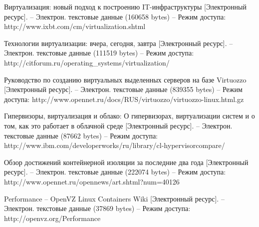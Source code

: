 \begin{thebibliography}{00}
    Виртуализация: новый подход к построению IT-инфраструктуры
    [Электронный ресурс]. --
    Электрон. текстовые данные (160658 bytes) -- 
    Режим доступа: http://www.ixbt.com/cm/virtualization.shtml

    Технологии виртуализации: вчера, сегодня, завтра
    [Электронный ресурс]. --
    Электрон. текстовые данные (111519 bytes) -- 
    Режим доступа: http://citforum.ru/operating\_systems/virtualization/

    Руководство по созданию виртуальных выделенных серверов на базе Virtuozzo
    [Электронный ресурс]. --
    Электрон. текстовые данные (839355 bytes) -- 
    Режим доступа: http://www.opennet.ru/docs/RUS/virtuozzo/virtuozzo-linux.html.gz

    Гипервизоры, виртуализация и облако: О гипервизорах, виртуализации систем и о том, как это работает в облачной среде
    [Электронный ресурс]. --
    Электрон. текстовые данные (87662 bytes) -- 
    Режим доступа: http://www.ibm.com/developerworks/ru/library/cl-hypervisorcompare/

    Обзор достижений контейнерной изоляции за последние два года
    [Электронный ресурс]. --
    Электрон. текстовые данные (222074 bytes) -- 
    Режим доступа: http://www.opennet.ru/opennews/art.shtml?num=40126

    Performance -- OpenVZ Linux Containers Wiki
    [Электронный ресурс]. --
    Электрон. текстовые данные (37869 bytes) -- 
    Режим доступа: http://openvz.org/Performance

\end{thebibliography}
\endgroup

\clearpage
